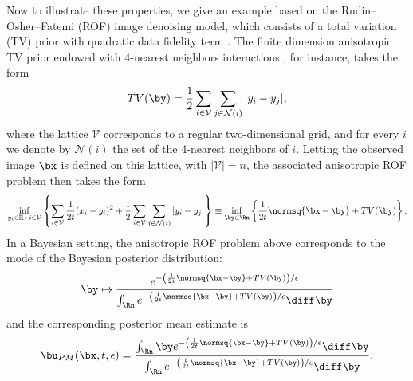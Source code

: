 Now to illustrate these properties, we give an example based on the Rudin--Osher--Fatemi (ROF) image denoising model, which consists of a total variation (TV) prior with quadratic data fidelity term \cite{bouman1993generalized,chambolle1997image,rudin1992nonlinear}. The finite dimension anisotropic TV prior endowed with 4-nearest neighbors interactions \cite{winkler2003image}, for instance, takes the form
\begin{equation*}
    TV(\by) = \frac{1}{2}\sum_{i \in \mathcal{V}}\sum_{j \in \mathcal{N}(i)}|y_i-y_j|,
\end{equation*}
where the lattice $\mathcal{V}$ corresponds to a regular two-dimensional grid, and for every $i$ we denote by $\mathcal{N}(i)$ the set of the 4-nearest neighbors of $i$. Letting the observed image $\bx$ is defined on this lattice, with $|\mathcal{V}|= n$, the associated anisotropic ROF problem \cite{rudin1992nonlinear} then takes the form
\begin{equation}\label{eq:rof_model}
\inf_{y_i \in \mathbb{R} \colon i \in \mathcal{V}}\left\{\sum_{i \in \mathcal{V}} \frac{1}{2t}(x_i - y_i)^2 + \frac{1}{2}\sum_{i \in \mathcal{V}}\sum_{j \in \mathcal{N}(i)}|y_i-y_j| \right\} \equiv \inf_{\by \in \Rn}\left\{\frac{1}{2t}\normsq{\bx-\by} + TV(\by) \right\}.
\end{equation}
In a Bayesian setting, the anisotropic ROF problem above corresponds to the mode of the Bayesian posterior distribution:
\begin{equation}\label{eq:rof_dist}
\by \mapsto \frac{e^{-\left(\frac{1}{2t}\normsq{\bx-\by} + TV(\by)\right)/\epsilon}}{\int_{\Rn} e^{-\left(\frac{1}{2t}\normsq{\bx-\by} + TV(\by)\right)/\epsilon} \diff\by}
\end{equation}
and the corresponding posterior mean estimate is
\begin{equation}\label{eq:pm_tv}
\bu_{PM}(\bx,t,\epsilon) = \frac{\int_{\Rn} \by e^{-\left(\frac{1}{2t}\normsq{\bx-\by} + TV(\by)\right)/\epsilon} \diff \by}{\int_{\Rn} e^{-\left(\frac{1}{2t}\normsq{\bx-\by} + TV(\by)\right)/\epsilon} \diff\by}.
\end{equation}

